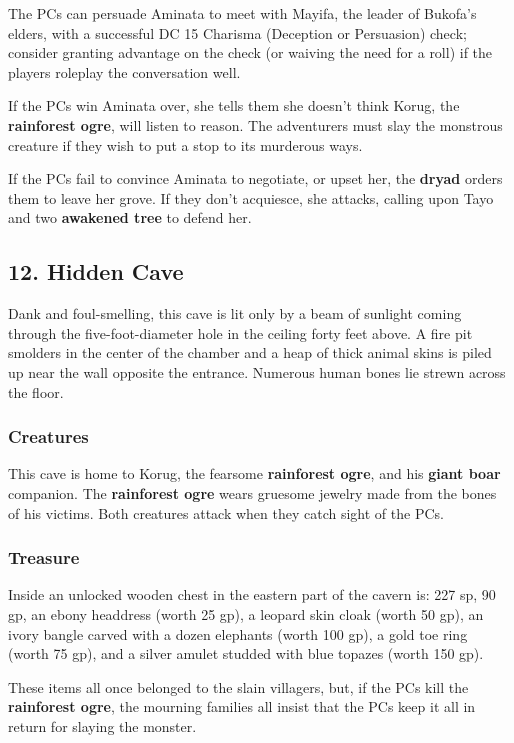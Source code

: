\documentclass[10pt,a4paper,twoside,bg=print,twocolumn,openany,nodeprecatedcode]{dndbook}
\begin{document}
The PCs can persuade Aminata to meet with Mayifa, the leader of Bukofa's elders, with a successful DC 15 Charisma (Deception or Persuasion) check; consider granting advantage on the check (or waiving the need for a roll) if the players roleplay the conversation well.

If the PCs win Aminata over, she tells them she doesn't think Korug, the \textbf{rainforest ogre}, will listen to reason. The adventurers must slay the monstrous creature if they wish to put a stop to its murderous ways.

If the PCs fail to convince Aminata to negotiate, or upset her, the \textbf{dryad} orders them to leave her grove. If they don't acquiesce, she attacks, calling upon Tayo and two \textbf{awakened tree} to defend her.

\subsection{12. Hidden Cave}
\begin{DndReadAloud}{}
Dank and foul-smelling, this cave is lit only by a beam of sunlight coming through the five-foot-diameter hole in the ceiling forty feet above. A fire pit smolders in the center of the chamber and a heap of thick animal skins is piled up near the wall opposite the entrance. Numerous human bones lie strewn across the floor.

\end{DndReadAloud}

\subsubsection{Creatures}
This cave is home to Korug, the fearsome \textbf{rainforest ogre}, and his \textbf{giant boar} companion. The \textbf{rainforest ogre} wears gruesome jewelry made from the bones of his victims. Both creatures attack when they catch sight of the PCs.

\subsubsection{Treasure}
Inside an unlocked wooden chest in the eastern part of the cavern is: 227 sp, 90 gp, an ebony headdress (worth 25 gp), a leopard skin cloak (worth 50 gp), an ivory bangle carved with a dozen elephants (worth 100 gp), a gold toe ring (worth 75 gp), and a silver amulet studded with blue topazes (worth 150 gp).

These items all once belonged to the slain villagers, but, if the PCs kill the \textbf{rainforest ogre}, the mourning families all insist that the PCs keep it all in return for slaying the monster.
\end{document}
